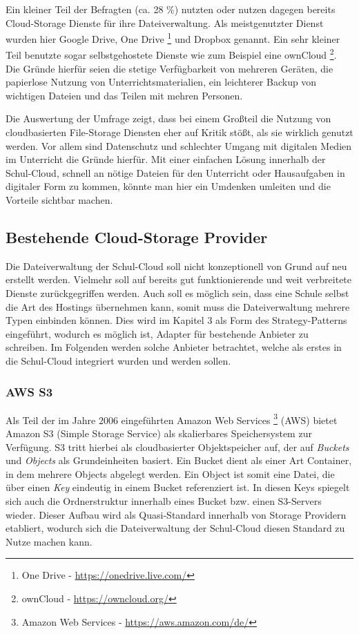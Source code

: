 Ein kleiner Teil der Befragten (ca. 28 \%) nutzten oder nutzen dagegen bereits Cloud-Storage Dienste für ihre Dateiverwaltung. Als meistgenutzter Dienst wurden hier Google Drive, One Drive  \footnote{One Drive - \url{https://onedrive.live.com/}} und Dropbox genannt. Ein sehr kleiner Teil benutzte sogar selbstgehostete Dienste wie zum Beispiel eine ownCloud \footnote{ownCloud - \url{https://owncloud.org/}}. Die Gründe hierfür seien die stetige Verfügbarkeit von mehreren Geräten, die papierlose Nutzung von Unterrichtsmaterialien, ein leichterer Backup von wichtigen Dateien und das Teilen mit mehren Personen. 

Die Auswertung der Umfrage zeigt, dass bei einem Großteil die Nutzung von cloudbasierten File-Storage Diensten eher auf Kritik stößt, als sie wirklich genutzt werden. Vor allem sind Datenschutz und schlechter Umgang mit digitalen Medien im Unterricht die Gründe hierfür. Mit einer einfachen Lösung innerhalb der Schul-Cloud, schnell an nötige Dateien für den Unterricht oder Hausaufgaben in digitaler Form zu kommen, könnte man hier ein Umdenken umleiten und die Vorteile sichtbar machen.

\subsection{Bestehende Cloud-Storage Provider}

Die Dateiverwaltung der Schul-Cloud soll nicht konzeptionell von Grund auf neu erstellt werden. Vielmehr soll auf bereits gut funktionierende und weit verbreitete Dienste zurückgegriffen werden. Auch soll es möglich sein, dass eine Schule selbst die Art des Hostings übernehmen kann, somit muss die Dateiverwaltung mehrere Typen einbinden können. Dies wird im Kapitel 3 als Form des Strategy-Patterns eingeführt, wodurch es möglich ist, Adapter für bestehende Anbieter zu schreiben. Im Folgenden werden solche Anbieter betrachtet, welche als erstes in die Schul-Cloud integriert wurden und werden sollen.

\subsubsection{AWS S3}

Als Teil der im Jahre 2006 eingeführten Amazon Web Services \footnote{Amazon Web Services - \url{https://aws.amazon.com/de/}} (AWS) bietet Amazon S3 (Simple Storage Service) als skalierbares Speichersystem zur Verfügung. S3 tritt hierbei als cloudbasierter Objektspeicher auf, der auf \textit{Buckets} und \textit{Objects} als Grundeinheiten basiert. Ein Bucket dient als einer Art Container, in dem mehrere Objects abgelegt werden. Ein Object ist somit eine Datei, die über einen \textit{Key} eindeutig in einem Bucket referenziert ist. In diesen Keys spiegelt sich auch die Ordnerstruktur innerhalb eines Bucket bzw. einen S3-Servers wieder. Dieser Aufbau wird als Quasi-Standard innerhalb von Storage Providern etabliert, wodurch sich die Dateiverwaltung der Schul-Cloud diesen Standard zu Nutze machen kann.

